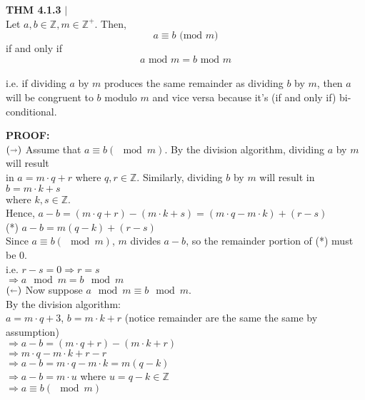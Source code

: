 \documentclass [12pt]{article}
\begin{document}
\begin{framed}
\textbf{THM 4.1.3} $|$ \\
\vspace{0.5cm}
Let $a, b \in \mathbb{Z}, m \in \mathbb{Z}^{+}$. Then, \\
\[a \equiv b \text{ (mod }m) \]
if and only if
\[a \text{ mod } m = b \text{ mod } m\]\\
i.e. if dividing $a$ by $m$ produces the same remainder as dividing $b$ by $m$, then $a$ will be congruent to $b$ modulo $m$ and vice versa because it's (if and only if) bi-conditional.
\end{framed}
\raggedright
\textbf{PROOF:}\\
\quad $(\shortrightarrow )$ Assume that $a \equiv b (\mod m)$. By the division algorithm, dividing $a$ by $m$ will result \\
\quad in $a = m\cdot q + r$ where $q, r \in \mathbb{Z}$. Similarly, dividing $b$ by $m$ will result in $b = m\cdot k + s$\\
\quad where $k, s \in \mathbb{Z}$. \\
\quad Hence, $a-b = (m\cdot q + r) - (m\cdot k + s) = (m\cdot q - m\cdot k) + (r - s)$\\
\quad (*)  $a-b = m(q-k) + (r - s)$\\
\quad Since $a\equiv b (\mod m)$, $m$ divides $a-b$, so the remainder portion of (*) must be 0.\\
\quad\quad i.e. $r-s = 0 \Rightarrow r=s$\\
\quad\quad $\Rightarrow a\mod m = b\mod m$\\
\vspace{0.3cm}
\quad $(\shortleftarrow)$ Now suppose $a\mod m \equiv b \mod m$.\\
\quad By the division algorithm:\\
\quad $a=m\cdot q + 3$, $b = m\cdot k + r$ \quad (notice remainder are the same the same by assumption)\\
\quad $\Rightarrow a-b = (m\cdot q + r)-(m\cdot k + r)$\\
\quad$\Rightarrow m\cdot q - m \cdot k + r - r$\\
\quad$\Rightarrow a - b = m\cdot q - m \cdot k = m(q-k)$\\
\quad$\Rightarrow a-b = m\cdot u $ where $u = q - k \in\mathbb{Z}$\\
\quad $\Rightarrow a \equiv b(\mod{m})$\\
\pagebreak
\end{document}
